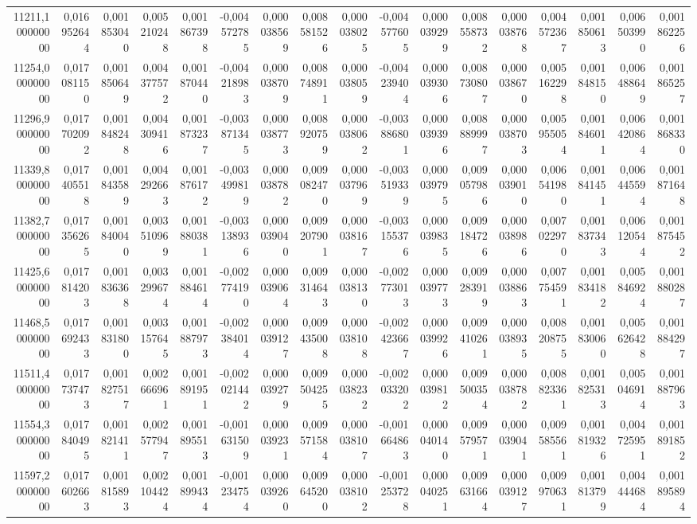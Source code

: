 \begin{longtable}{rrrrrrrrrrrrrrrrr}
11211,100000000 & 0,016952644 & 0,001853040 & 0,005210248 & 0,001867398 & -0,004572785 & 0,000038569 & 0,008581526 & 0,000038025 & -0,004577605 & 0,000039299 & 0,008558732 & 0,000038768 & 0,004572367 & 0,001850613 & 0,006503990 & 0,001862256\\
11254,000000000 & 0,017081150 & 0,001850649 & 0,004377572 & 0,001870440 & -0,004218983 & 0,000038709 & 0,008748911 & 0,000038059 & -0,004239404 & 0,000039306 & 0,008730807 & 0,000038670 & 0,005162298 & 0,001848150 & 0,006488649 & 0,001865257\\
11296,900000000 & 0,017702092 & 0,001848248 & 0,004309416 & 0,001873237 & -0,003871345 & 0,000038773 & 0,008920759 & 0,000038062 & -0,003886801 & 0,000039396 & 0,008889997 & 0,000038703 & 0,005955054 & 0,001846011 & 0,006420864 & 0,001868330\\
11339,800000000 & 0,017405518 & 0,001843589 & 0,004292663 & 0,001876172 & -0,003499819 & 0,000038782 & 0,009082470 & 0,000037969 & -0,003519339 & 0,000039795 & 0,009057986 & 0,000039010 & 0,006541980 & 0,001841451 & 0,006445594 & 0,001871648\\
11382,700000000 & 0,017356265 & 0,001840040 & 0,003510969 & 0,001880381 & -0,003138936 & 0,000039040 & 0,009207901 & 0,000038167 & -0,003155376 & 0,000039835 & 0,009184726 & 0,000038986 & 0,007022970 & 0,001837343 & 0,006120544 & 0,001875452\\
11425,600000000 & 0,017814203 & 0,001836368 & 0,003299674 & 0,001884614 & -0,002774190 & 0,000039064 & 0,009314643 & 0,000038130 & -0,002773013 & 0,000039773 & 0,009283919 & 0,000038863 & 0,007754591 & 0,001834182 & 0,005846924 & 0,001880287\\
11468,500000000 & 0,017692433 & 0,001831800 & 0,003157645 & 0,001887973 & -0,002384014 & 0,000039127 & 0,009435008 & 0,000038108 & -0,002423667 & 0,000039926 & 0,009410261 & 0,000038935 & 0,008208755 & 0,001830060 & 0,005626428 & 0,001884297\\
11511,400000000 & 0,017737473 & 0,001827517 & 0,002666961 & 0,001891951 & -0,002021442 & 0,000039279 & 0,009504255 & 0,000038232 & -0,002033202 & 0,000039812 & 0,009500354 & 0,000038782 & 0,008823361 & 0,001825313 & 0,005046914 & 0,001887963\\
11554,300000000 & 0,017840495 & 0,001821411 & 0,002577947 & 0,001895513 & -0,001631509 & 0,000039231 & 0,009571584 & 0,000038107 & -0,001664863 & 0,000040140 & 0,009579571 & 0,000039041 & 0,009585561 & 0,001819326 & 0,004725951 & 0,001891852\\
11597,200000000 & 0,017602663 & 0,001815893 & 0,002104424 & 0,001899434 & -0,001234754 & 0,000039260 & 0,009645200 & 0,000038102 & -0,001253728 & 0,000040251 & 0,009631664 & 0,000039127 & 0,009970631 & 0,001813799 & 0,004444684 & 0,001895894\\

\end{longtable}
